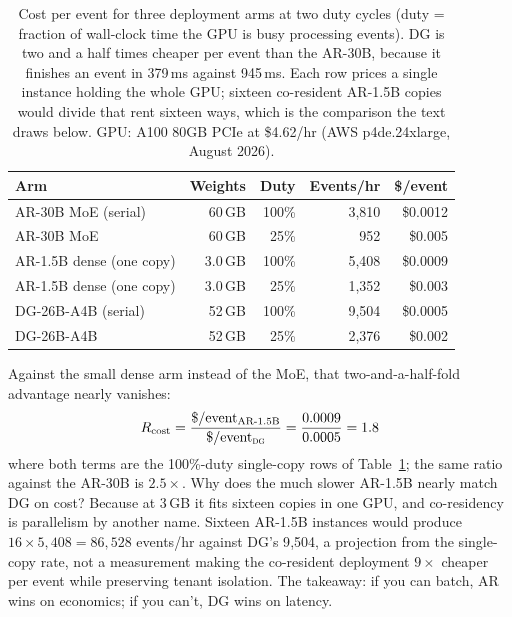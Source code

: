 \begin{table}[h]
\centering
\caption{Cost per event for three deployment arms at two duty cycles
(duty = fraction of wall-clock time the GPU is busy processing events).
DG is two and a half times cheaper per event than the AR-30B, because it
finishes an event in 379\,ms against 945\,ms. Each row prices a
single instance holding the whole GPU; sixteen co-resident AR-1.5B
copies would divide that rent sixteen ways, which is the comparison
the text draws below. GPU: A100 80GB PCIe at \$4.62/hr (AWS
p4de.24xlarge, August 2026).}
\label{tab:cost}
\begin{tabular}{@{}lrrrr@{}}
\toprule
Arm & Weights & Duty & Events/hr & \$/event \\
\midrule
AR-30B MoE (serial) & 60\,GB & 100\% & 3{,}810 & \$0.0012 \\
AR-30B MoE           & 60\,GB & 25\%  & 952 & \$0.005 \\
\midrule
AR-1.5B dense (one copy)    & 3.0\,GB & 100\% & 5{,}408 & \$0.0009 \\
AR-1.5B dense (one copy)     & 3.0\,GB & 25\%  & 1{,}352 & \$0.003 \\
\midrule
DG-26B-A4B (serial)  & 52\,GB & 100\% & 9{,}504 & \$0.0005 \\
DG-26B-A4B            & 52\,GB & 25\%  & 2{,}376 & \$0.002 \\
\bottomrule
\end{tabular}
\end{table}

Against the small dense arm instead of the MoE, that two-and-a-half-fold
advantage nearly vanishes:
\begin{equation}
R_{\mathrm{cost}} = \frac{\$ / \mathrm{event}_{\text{AR-1.5B}}}
{\$ / \mathrm{event}_{\textsc{dg}}}
= \frac{0.0009}{0.0005} = 1.8
\end{equation}
where both terms are the 100\%-duty single-copy rows of
Table~\ref{tab:cost}; the same ratio against the AR-30B is
$2.5\times$. Why does the much slower AR-1.5B nearly match DG on
cost? Because at 3\,GB it fits sixteen copies in one GPU, and
co-residency is parallelism by another name. Sixteen AR-1.5B instances
would produce $16 \times 5{,}408 = 86{,}528$ events/hr against DG's
9{,}504, a projection from the single-copy rate, not a measurement
making the co-resident deployment $9\times$ cheaper per event while
preserving tenant isolation. The takeaway: if you can batch, AR
wins on economics; if you can't, DG wins on latency.

